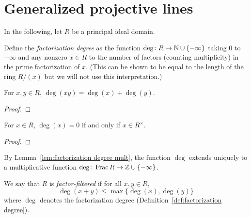 \section{Generalized projective lines}

In the following, let $R$ be a principal ideal domain.

\begin{definition} \label{def:factorization degree}
\leanok
Define the \emph{factorization degree} as the function $\deg \colon R \to \mathbb{N} \cup \{-\infty\}$
taking $0$ to $-\infty$ and any nonzero $x \in R$ to the number of factors (counting multiplicity) in the prime factorization of $x$. (This can be shown to be equal to the length of the ring $R/(x)$ but we will not use this interpretation.)
\end{definition}

\begin{lemma} \label{lem:factorization degree mult}
\leanok
For $x,y \in R$, $\deg(xy) = \deg(x) + \deg(y)$.
\end{lemma}
\begin{proof}
\leanok
\end{proof}

\begin{lemma} \label{lem:factorization degree 0}
\leanok
For $x \in R$, $\deg(x) = 0$ if and only if $x \in R^\times$.
\end{lemma}
\begin{proof}
\leanok
\end{proof}

\begin{definition} \label{def:degree extension}
\leanok
By Lemma~\ref{lem:factorization degree mult},
the function $\deg$ extends uniquely to a multiplicative function $\deg\colon \operatorname{Frac} R \to \mathbb{Z} \cup \{-\infty\}$.
\end{definition}

\begin{definition} \label{def:factor filtered}
\leanok
We say that $R$ is \emph{factor-filtered} if for all $x,y \in R$, 
\[
\deg(x+y) \leq \max\{\deg(x), \deg(y)\}
\]
where $\deg$ denotes the factorization degree (Definition~\ref{def:factorization degree}).
\end{definition}

